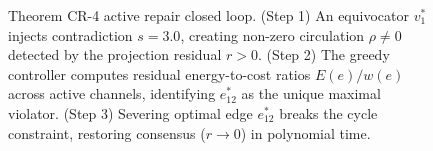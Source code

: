 \begin{figure}[htbp]
\caption{Theorem CR-4 active repair closed loop. (Step 1) An equivocator $v_1^*$ injects contradiction $s = 3.0$, creating non-zero circulation $\rho \ne 0$ detected by the projection residual $r > 0$. (Step 2) The greedy controller computes residual energy-to-cost ratios $E(e)/w(e)$ across active channels, identifying $e_{12}^*$ as the unique maximal violator. (Step 3) Severing optimal edge $e_{12}^*$ breaks the cycle constraint, restoring consensus ($r \to 0$) in polynomial time.}
\label{fig:repair}
\end{figure}
